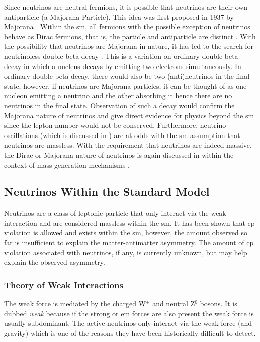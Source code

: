 Since neutrinos are neutral fermions, it is possible that neutrinos are their own antiparticle (a Majorana Particle). This idea was first proposed in 1937 by Majorana \cite{Majorana2020}. Within the \Gls{sm}, all fermions with the possible exception of neutrinos behave as Dirac fermions, that is, the particle and antiparticle are distinct \cite{dirac_majorana_neutrinos}. With the possibility that neutrinos are Majorana in nature, it has led to the search for neutrinoless double beta decay \cite{Double_beta_decay}. This is a variation on ordinary double beta decay in which a nucleus decays by emitting two electrons simultaneously. In ordinary double beta decay, there would also be two (anti)neutrinos in the final state, however, if neutrinos are Majorana particles, it can be thought of as one nucleon emitting a neutrino and the other absorbing it hence there are no neutrinos in the final state. Observation of such a decay would confirm the Majorana nature of neutrinos and give direct evidence for physics beyond the \Gls{sm} since the lepton number would not be conserved. Furthermore, neutrino oscillations (which is discussed in ) are at odds with the \gls{sm} assumption that neutrinos are massless. With the requirement that neutrinos are indeed massive, the Dirac or Majorana nature of neutrinos is again discussed in  within the context of mass generation mechanisms \cite{The_physics_of_neutrinos_book}.

\subsection{Neutrinos Within the Standard Model}

Neutrinos are a class of leptonic particle that only interact via the weak interaction and are considered massless within the \gls{sm}. It has been shown that \gls{cp} violation is allowed and exists within the \gls{sm}, however, the amount observed so far is insufficient to explain the matter-antimatter asymmetry. The amount of \gls{cp} violation associated with neutrinos, if any, is currently unknown, but may help explain the observed asymmetry. 

\subsubsection{Theory of Weak Interactions}\label{subsubsec:Theory of Weak Interactions}
The weak force is mediated by the charged W$^\pm$ and neutral Z$^0$ bosons. It is dubbed \textit{weak} because if the strong or \gls{em} forces are also present the weak force is usually subdominant. The active neutrinos only interact via the weak force (and gravity) which is one of the reasons they have been historically difficult to detect. 

